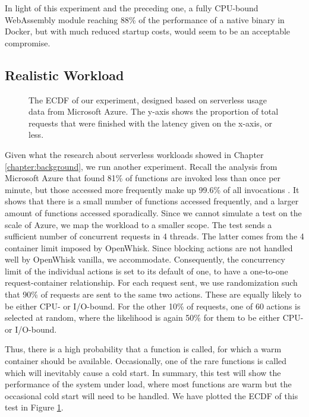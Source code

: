 In light of this experiment and the preceding one, a fully CPU-bound WebAssembly module reaching 88\% of the performance of a native binary in Docker, but with much reduced startup costs, would seem to be an acceptable compromise.

\subsection{Realistic Workload}

\begin{figure}
    \begin{center}
        
    \end{center}
    \caption{The ECDF of our experiment, designed based on serverless usage data from Microsoft Azure. The y-axis shows the proportion of total requests that were finished with the latency given on the x-axis, or less.}
    \label{fig:pc-load-zipf}
\end{figure}

Given what the research about serverless workloads showed in Chapter \ref{chapter:background}, we run another experiment. Recall the analysis from Microsoft Azure that found 81\% of functions are invoked less than once per minute, but those accessed more frequently make up 99.6\% of all invocations \cite{Shahrad2020}.
It shows that there is a small number of functions accessed frequently, and a larger amount of functions accessed sporadically.
Since we cannot simulate a test on the scale of Azure, we map the workload to a smaller scope. The test sends a sufficient number of concurrent requests in 4 threads. The latter comes from the 4 container limit imposed by OpenWhisk. Since blocking actions are not handled well by OpenWhisk vanilla, we accommodate. Consequently, the concurrency limit of the individual actions is set to its default of one, to have a one-to-one request-container relationship. For each request sent, we use randomization such that 90\% of requests are sent to the same two actions. These are equally likely to be either CPU- or I/O-bound. For the other 10\% of requests, one of 60 actions is selected at random, where the likelihood is again 50\% for them to be either CPU- or I/O-bound.

Thus, there is a high probability that a function is called, for which a warm container should be available. Occasionally, one of the rare functions is called which will inevitably cause a cold start. In summary, this test will show the performance of the system under load, where most functions are warm but the occasional cold start will need to be handled. We have plotted the ECDF of this test in Figure \ref{fig:pc-load-zipf}.

